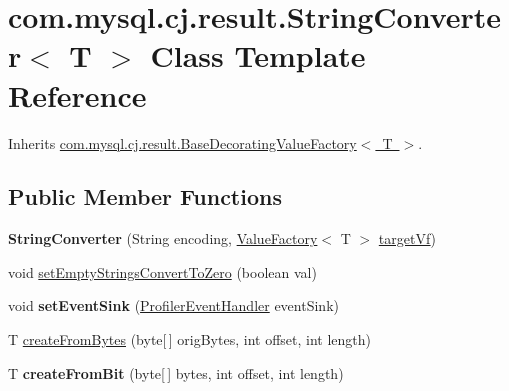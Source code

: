 \hypertarget{classcom_1_1mysql_1_1cj_1_1result_1_1_string_converter}{}\section{com.\+mysql.\+cj.\+result.\+String\+Converter$<$ T $>$ Class Template Reference}
\label{classcom_1_1mysql_1_1cj_1_1result_1_1_string_converter}


Inherits \mbox{\hyperlink{classcom_1_1mysql_1_1cj_1_1result_1_1_base_decorating_value_factory}{com.\+mysql.\+cj.\+result.\+Base\+Decorating\+Value\+Factory$<$ T $>$}}.

\subsection*{Public Member Functions}
\begin{DoxyCompactItemize}
\item 
\mbox{\label{classcom_1_1mysql_1_1cj_1_1result_1_1_string_converter_aa40363fd36257ba577e49dfc3d9b26d4}} 
{\bfseries String\+Converter} (String encoding, \mbox{\hyperlink{interfacecom_1_1mysql_1_1cj_1_1result_1_1_value_factory}{Value\+Factory}}$<$ T $>$ \mbox{\hyperlink{classcom_1_1mysql_1_1cj_1_1result_1_1_base_decorating_value_factory_a64c2c62bd9906ec3af7fc62e58bf34b3}{target\+Vf}})
\item 
void \mbox{\hyperlink{classcom_1_1mysql_1_1cj_1_1result_1_1_string_converter_ab43f945452ba741f823d67b68b3bade8}{set\+Empty\+Strings\+Convert\+To\+Zero}} (boolean val)
\item 
\mbox{\label{classcom_1_1mysql_1_1cj_1_1result_1_1_string_converter_a5760eb57f0d3b27722734bd63e741507}} 
void {\bfseries set\+Event\+Sink} (\mbox{\hyperlink{interfacecom_1_1mysql_1_1cj_1_1log_1_1_profiler_event_handler}{Profiler\+Event\+Handler}} event\+Sink)
\item 
T \mbox{\hyperlink{classcom_1_1mysql_1_1cj_1_1result_1_1_string_converter_a62092d8d4f0919ee0c63e7b4caf29d5a}{create\+From\+Bytes}} (byte\mbox{[}$\,$\mbox{]} orig\+Bytes, int offset, int length)
\item 
\mbox{\label{classcom_1_1mysql_1_1cj_1_1result_1_1_string_converter_a328be706c2bb9de113338b42cb20d8c6}} 
T {\bfseries create\+From\+Bit} (byte\mbox{[}$\,$\mbox{]} bytes, int offset, int length)
\end{DoxyCompactItemize}
